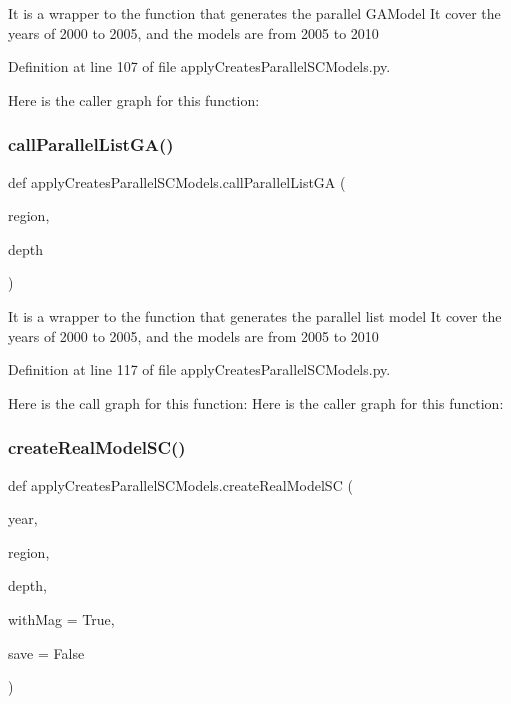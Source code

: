 \begin{DoxyVerb}It is a wrapper to the function that generates the parallel GAModel
It cover the years of 2000 to 2005, and the models are from 2005 to 2010
\end{DoxyVerb}
 

Definition at line 107 of file apply\+Creates\+Parallel\+S\+C\+Models.\+py.

Here is the caller graph for this function\+:
\mbox{\label{namespaceapply_creates_parallel_s_c_models_a166eeee0a5ca5050af7cb56cbc310a1d}} 
\subsubsection{\texorpdfstring{call\+Parallel\+List\+G\+A()}{callParallelListGA()}}
{\footnotesize\ttfamily def apply\+Creates\+Parallel\+S\+C\+Models.\+call\+Parallel\+List\+GA (\begin{DoxyParamCaption}\item[{}]{region,  }\item[{}]{depth }\end{DoxyParamCaption})}

\begin{DoxyVerb}It is a wrapper to the function that generates the parallel  list model
It cover the years of 2000 to 2005, and the models are from 2005 to 2010
\end{DoxyVerb}
 

Definition at line 117 of file apply\+Creates\+Parallel\+S\+C\+Models.\+py.

Here is the call graph for this function\+:
Here is the caller graph for this function\+:
\mbox{\label{namespaceapply_creates_parallel_s_c_models_a88cc12e7976c17d0a8aa2ff7c8a34d31}} 
\subsubsection{\texorpdfstring{create\+Real\+Model\+S\+C()}{createRealModelSC()}}
{\footnotesize\ttfamily def apply\+Creates\+Parallel\+S\+C\+Models.\+create\+Real\+Model\+SC (\begin{DoxyParamCaption}\item[{}]{year,  }\item[{}]{region,  }\item[{}]{depth,  }\item[{}]{with\+Mag = {\ttfamily True},  }\item[{}]{save = {\ttfamily False} }\end{DoxyParamCaption})}

